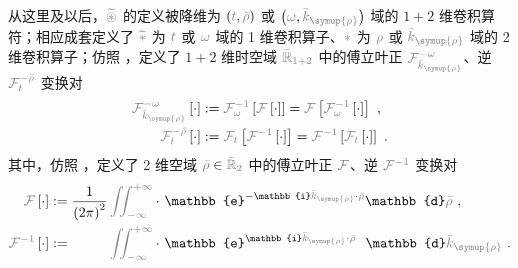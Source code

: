 从这里及以后，$\mathcolor{gray}{\widetilde \circledast}$ 的定义被降维为 $\left( \mathcolor{gray}{t}, \mathcolor{gray}{\bar{\rho}} \right)$ 或 $\left( \mathcolor{gray}{\omega}, \mathcolor{gray}{\bar{k}_{\symup{\rho}}} \right)$ 域的 $1+2$ 维卷积算符；相应成套定义了 $\mathcolor{gray}{\widetilde *}$ 为 $\mathcolor{gray}{t}$ 或 $\mathcolor{gray}{\omega}$ 域的 1 维卷积算子、$\mathcolor{gray}{*}$ 为 $\mathcolor{gray}{\rho}$ 或 $\mathcolor{gray}{\bar{k}_{\symup{\rho}}}$ 域的 2 维卷积算子；仿照 ，定义了 $1+2$ 维时空域 $\mathcolor{gray}{\bar{\mathbb{R}}_{1+2}}$ 中的傅立叶正 $\mathcolor{gray}{\mathcal F_{\bar{k}_{\symup{\rho}}}^{-\omega}}$、逆 $\mathcolor{gray}{\mathcal F^{-\bar{\rho}}_{t}}$ 变换对
\begin{subequations} \label{eq:FT-trho_wkrho}
	\abovedisplayskip=4pt
	\belowdisplayskip=6pt
\begin{align}
	\mathcolor{gray}{\mathcal F_{\bar{k}_{\symup{\rho}}}^{-\omega}} \left[ \cdot \right] &:= \mathcolor{gray}{\mathcal F_{\omega}^{-1}} \left[ \mathcolor{gray}{\mathcal F} \left[ \cdot \right] \right] = \mathcolor{gray}{\mathcal F} \left[ \mathcolor{gray}{\mathcal F_{\omega}^{-1}} \left[ \cdot \right] \right] ~, \label{eq:FT-wkrho} \\
	\mathcolor{gray}{\mathcal F^{-\bar{\rho}}_{t}} \left[ \cdot \right] &:= \mathcolor{gray}{\mathcal F_{t}} \left[ \mathcolor{gray}{\mathcal F^{-1}} \left[ \cdot \right] \right] = \mathcolor{gray}{\mathcal F^{-1}} \left[ \mathcolor{gray}{\mathcal F_{t}} \left[ \cdot \right] \right] ~. \label{eq:IFT-trho}
\end{align}
\end{subequations}
其中，仿照 ，定义了 2 维空域 $\mathcolor{gray}{\bar{\rho}} \in \mathcolor{gray}{\bar{\mathbb{R}}_{2}}$ 中的傅立叶正 $\mathcolor{gray}{\mathcal F}$、逆 $\mathcolor{gray}{\mathcal F^{-1}}$ 变换对
\begin{subequations} \label{eq:FT-rho_krho}
	\belowdisplayskip=8pt
\begin{align}
	\mathcolor{gray}{\mathcal F} \left[ \cdot \right] &:= \frac{ 1 }{ \left( 2\pi \right)^2 } \mathcolor{gray}{\iint_{-\infty}^{+\infty}} \cdot~ \mathbb{e}^{-\mathbb{i}\mathcolor{gray}{\bar{k}_{\symup{\rho}}} \cdot \mathcolor{gray}{\bar{\rho}}} \mathbb{d}\mathcolor{gray}{\bar{\rho}} ~, \label{eq:FT-krho} \\
	\mathcolor{gray}{\mathcal F^{-1}} \left[ \cdot \right] &:= \hphantom{\frac{ 1 }{ \left( 2\pi \right)^3 }} \mathcolor{gray}{\iint_{-\infty}^{+\infty}} \cdot~ \mathbb{e}^{\mathbb{i}\mathcolor{gray}{\bar{k}_{\symup{\rho}}} \cdot \mathcolor{gray}{\bar{\rho}}} \hphantom{^-} \mathbb{d}\mathcolor{gray}{\bar{k}_{\symup{\rho}}} ~. \label{eq:IFT-rho}
\end{align}
\end{subequations}

